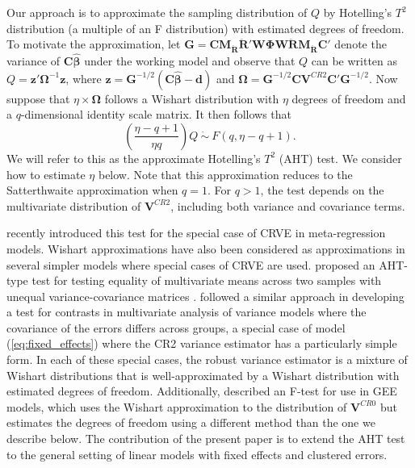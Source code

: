 \documentclass[12pt]{article}\usepackage[]{graphicx}\usepackage[]{color}
\newcommand{\bm}{\mathbf}
\newcommand{\bs}{\boldsymbol}
\begin{document}
Our approach is to approximate the sampling distribution of $Q$ by Hotelling's $T^2$ distribution (a multiple of an F distribution) with estimated degrees of freedom. To motivate the approximation, let $\bm{G} = \bm{C} \bm{M_{\ddot{R}}}\bm{\ddot{R}}'\bm{W}\bs\Phi\bm{W}\bm{\ddot{R}}\bm{M_{\ddot{R}}} \bm{C}'$ denote the variance of $\bm{C}\bs{\hat\beta}$ under the working model and observe that $Q$ can be written as $Q = \bm{z}' \bs\Omega^{-1} \bm{z}$, where $\bm{z} = \bm{G}^{-1/2}\left(\bm{C}\bs{\hat\beta} - \bm{d}\right)$ and $\bs\Omega = \bm{G}^{-1/2} \bm{C} \bm{V}^{CR2}\bm{C}'\bm{G}^{-1/2}$. 
Now suppose that $\eta \times \bs\Omega$ follows a Wishart distribution with $\eta$ degrees of freedom and a $q$-dimensional identity scale matrix. It then follows that
\begin{equation}
\label{eq:AHT}
\left(\frac{\eta - q + 1}{\eta q}\right) Q \ \dot\sim \ F(q, \eta - q + 1).
\end{equation}
We will refer to this as the approximate Hotelling's $T^2$ (AHT) test.
We consider how to estimate $\eta$ below.
Note that this approximation reduces to the Satterthwaite approximation when $q = 1$. 
For $q > 1$, the test depends on the multivariate distribution of $\bm{V}^{CR2}$, including both variance and covariance terms. 

 recently introduced this test for the special case of CRVE in meta-regression models.
Wishart approximations have also been considered as approximations in several simpler models where special cases of CRVE are used.
\citet{Nel1986solution} proposed an AHT-type test for testing equality of multivariate means across two samples with unequal variance-covariance matrices \citep[i.e., the multivariate Behrens-Fisher problem; see also][]{Krishnamoorthy2004modified}.
\citet{Zhang2012twowayANOVA} followed a similar approach in developing a test for contrasts in multivariate analysis of variance models where the covariance of the errors differs across groups, a special case of model (\ref{eq:fixed_effects}) where the CR2 variance estimator has a particularly simple form. 
In each of these special cases, the robust variance estimator is a mixture of Wishart distributions that is well-approximated by a Wishart distribution with estimated degrees of freedom.
Additionally, \citet{Pan2002small} described an F-test for use in GEE models, which uses the Wishart approximation to the distribution of $\bm{V}^{CR0}$ but estimates the degrees of freedom using a different method than the one we describe below.
The contribution of the present paper is to extend the AHT test to the general setting of linear models with fixed effects and clustered errors. 
\end{document}

